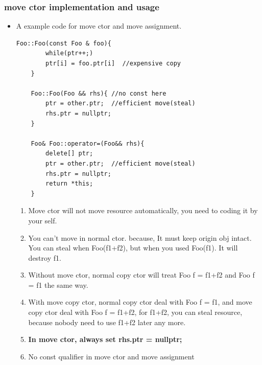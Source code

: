 \documentclass[a4paper,11pt,twoside]{book}
\begin{document}
\subsubsection{move ctor implementation and usage}
\begin{itemize}
	\item A example code for move ctor and move assignment.	
\begin{lstlisting}[numbers=none]
	Foo::Foo(const Foo & foo){
		while(ptr++;)
		ptr[i] = foo.ptr[i]  //expensive copy
	}
	
	Foo::Foo(Foo && rhs){ //no const here
		ptr = other.ptr;  //efficient move(steal)
		rhs.ptr = nullptr;
	}
	
	Foo& Foo::operator=(Foo&& rhs){
		delete[] ptr;
		ptr = other.ptr;  //efficient move(steal)
		rhs.ptr = nullptr;
		return *this;
	}
\end{lstlisting}
	

	
	\begin{enumerate}
		\item Move ctor will not move resource automatically, you need to coding it by your self.
		
		\item You can't move in normal ctor. because, It must keep origin obj intact.  You can steal when Foo(f1+f2), but when you used Foo(f1).  It will destroy f1.
		
		\item Without  move ctor, normal copy ctor will treat Foo f = f1+f2 and Foo f = f1 the same way.
		
		\item With move copy ctor, normal copy ctor deal with Foo f = f1, and move copy ctor deal with Foo f = f1+f2, for f1+f2, you can steal resource, because nobody need to use f1+f2 later any more.
		
		\item \textbf{In move ctor, always set rhs.ptr = nullptr;}
		
		\item No const qualifier in move ctor and move assignment
		
	\end{enumerate}
	

\end{itemize}
\end{document}
